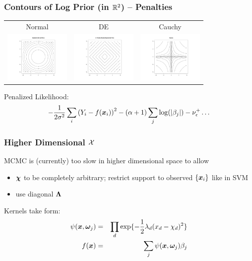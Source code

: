\documentclass[]{beamer}
\newcommand{\bs}[2]{\begin{frame} \frametitle{#1}
{#2}
\end{frame} }
\begin{document}
\bs{Contours of Log Prior (in $\mathbb{R}^2$) -- Penalties} {
\begin{tabular}{ccc}
Normal  & DE  & Cauchy \\
\includegraphics[angle=90,width=1.25in]{L2} &
\includegraphics[angle=90,width=1.25in]{L1} &
\includegraphics[angle=90,width=1.25in]{cauchy}
\end{tabular}

\vspace{.25in}
Penalized Likelihood:
$$-\frac{1}{2 \sigma^2} \sum_i\left(Y_i - f(\bm x_i)\right)^2  - (\alpha +
1) \sum_j
\log(|\beta_j|)  - \nu^+_{\epsilon} \ldots $$

}





\bs{Higher Dimensional $\mathcal{X}$} {

MCMC is (currently) too slow in higher dimensional space to allow \pause
\begin{itemize}
\item $\bm \chi$ to be completely arbitrary; restrict support to
  observed $\{\bm x_i\}$ like in SVM \pause
\item use diagonal $\bm \Lambda$
\end{itemize}
Kernels take form:
\begin{eqnarray*}
\psi(\bm x, \bm \omega_j) & = & \prod_d \exp\{ -\frac{1}{2} \lambda_d (x_d - \chi_{d})^2
\} \\
f(\bm x) & =  & \sum_j \psi(\bm x, \bm \omega_j) \beta_j
\end{eqnarray*}
}
\end{document}
